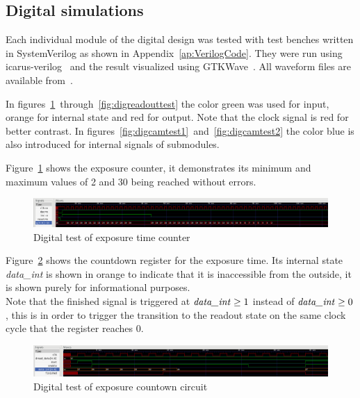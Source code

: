\newpage
\subsection{Digital simulations}

Each individual module of the digital design was tested with test benches written in SystemVerilog as shown in Appendix~\ref{ap:VerilogCode}.
They were run using icarus-verilog~\cite{icarusVL} and the result visualized using GTKWave~\cite{gtkwave}.
All waveform files are available from~\cite{githubProject}.

In figures~\ref{fig:digexptest}~through~\ref{fig:digreadouttest} the color green was used for input, orange for internal state and red for output.
Note that the clock signal is red for better contrast.
In figures~\ref{fig:digcamtest1}~and~\ref{fig:digcamtest2} the color blue is also introduced for internal signals of submodules.

Figure~\ref{fig:digexptest} shows the exposure counter, it demonstrates its minimum and maximum values of 2 and 30 being reached without errors.

\begin{figure}[H]
  \centering
  \includegraphics[width=\textwidth]{figures/expTest}
  \caption{Digital test of exposure time counter}
  \label{fig:digexptest}
\end{figure}

Figure~\ref{fig:digfcdtest} shows the countdown register for the exposure time. Its internal state \textit{data\_int} is shown in orange
to indicate that it is inaccessible from the outside, it is shown purely for informational purposes.\\
Note that the finished signal is triggered at $\text{\textit{data\_int}} \geq 1$ instead of $\text{\textit{data\_int}} \geq 0$,
this is in order to trigger the transition to the readout state on the same clock cycle that the register reaches 0.

\begin{figure}[H]
  \centering
  \includegraphics[width=\textwidth]{figures/fcdTest}
  \caption{Digital test of exposure countown circuit}
  \label{fig:digfcdtest}
\end{figure}

